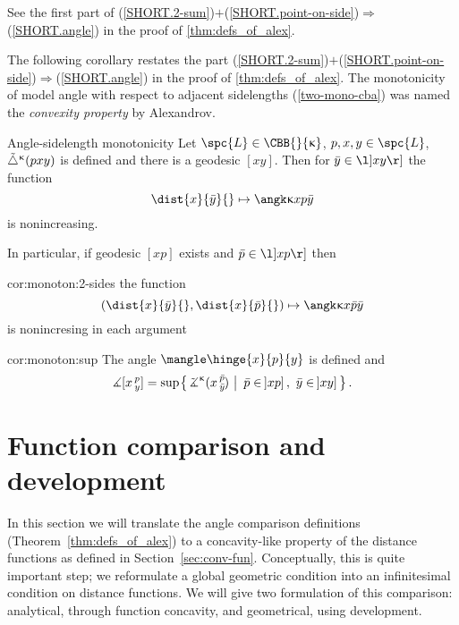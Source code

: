 See the first part of (\ref{SHORT.2-sum})$+$(\ref{SHORT.point-on-side})$\Rightarrow$(\ref{SHORT.angle}) in the proof of \ref{thm:defs_of_alex}.\qeds

The following corollary restates the part 
(\ref{SHORT.2-sum})$+$(\ref{SHORT.point-on-side})$\Rightarrow$(\ref{SHORT.angle}) in the proof of \ref{thm:defs_of_alex}. 
The monotonicity of  model angle with respect to adjacent sidelengths (\ref{two-mono-cba}) was named the \emph{convexity property} by Alexandrov.

\begin{thm}{Angle-sidelength  monotonicity}\label{cor:monoton} 
Let $\spc{L}\in\CBB{}{\kappa}$,
$p,x,y\in \spc{L}$,
${\tilde\triangle}^{\upkappa}(p x y)$ is defined
and there is a geodesic $[xy]$.
Then for $\bar y\in\l]xy\r]$ the function 
\[\dist{x}{\bar y}{}\mapsto \angk\kappa x p{\bar y}\] 
is nonincreasing.

In particular, if geodesic $[x p]$ exists and $\bar p\in \l]x p\r]$ then
\begin{subthm}{cor:monoton:2-sides}
the function 
\[(\dist{x}{\bar y}{},\dist{x}{\bar p}{})\mapsto \angk\kappa x {\bar p}{\bar y}\] is nonincresing in each argument
\end{subthm}
 
\begin{subthm}{cor:monoton:sup}
The angle $\mangle\hinge{x}{p}{y}$ is defined and 
\[\mangle\hinge{x}{p}{y}
=
\sup\set{\angk\kappa x {\bar p}{\bar y}}{
\bar p\in\l]xp\r],\ 
\bar y\in\l]xy\r]}.\]

\end{subthm}
\end{thm}


\section{Function comparison and development} \label{sec:func-comp-CBB}

In this section we will translate the angle comparison definitions (Theorem~\ref{thm:defs_of_alex}) 
to a concavity-like property of the distance functions as defined in Section~\ref{sec:conv-fun}.
Conceptually, this is quite important step;
we reformulate a global geometric condition into an infinitesimal condition on distance functions.
We will give two formulation of this comparison:
analytical, through function concavity, and geometrical, using development.

